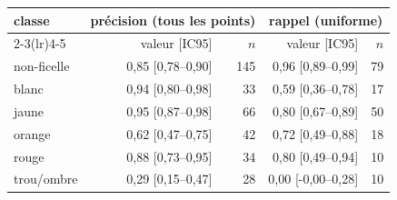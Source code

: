 \begin{tabular}{l rr rr}
\toprule
classe & \multicolumn{2}{c}{précision (tous les points)} & \multicolumn{2}{c}{rappel (uniforme)} \\
\cmidrule(lr){2-3}\cmidrule(lr){4-5}
 & valeur [IC95] & $n$ & valeur [IC95] & $n$ \\
\midrule
non-ficelle & 0{,}85 [0{,}78--0{,}90] & 145 & 0{,}96 [0{,}89--0{,}99] & 79 \\
blanc & 0{,}94 [0{,}80--0{,}98] & 33 & 0{,}59 [0{,}36--0{,}78] & 17 \\
jaune & 0{,}95 [0{,}87--0{,}98] & 66 & 0{,}80 [0{,}67--0{,}89] & 50 \\
orange & 0{,}62 [0{,}47--0{,}75] & 42 & 0{,}72 [0{,}49--0{,}88] & 18 \\
rouge & 0{,}88 [0{,}73--0{,}95] & 34 & 0{,}80 [0{,}49--0{,}94] & 10 \\
trou/ombre & 0{,}29 [0{,}15--0{,}47] & 28 & 0{,}00 [-0{,}00--0{,}28] & 10 \\
\bottomrule
\end{tabular}
